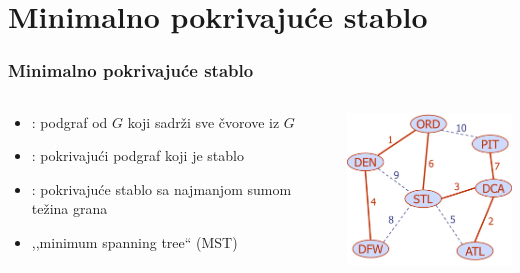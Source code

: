 \documentclass[compress]{beamer}
\begin{document}
\section[Minimalno pokrivajuće stablo]{Minimalno pokrivajuće stablo}

\begin{frame}[fragile]
  \frametitle{Minimalno pokrivajuće stablo}
  \begin{columns}
    \begin{column}[t]{7cm}
      \begin{itemize}
        \item {}: podgraf od $G$ koji sadrži 
          sve čvorove iz $G$
        \item {}: pokrivajući podgraf koji je
          stablo
        \item {}: pokrivajuće stablo
          sa najmanjom sumom težina grana
        \item ,,minimum spanning tree`` (MST)
      \end{itemize}
    \end{column}
    \begin{column}[t]{5cm}
      \begin{center}
        \includegraphics[width=5cm]{asp-14-pic68.png}
      \end{center}
    \end{column}
  \end{columns}
\end{frame}
\end{document}
